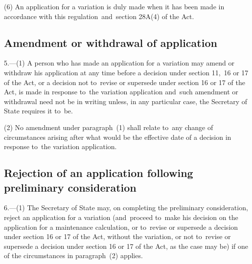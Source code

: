 \documentclass[12pt,a4paper]{article}
\begin{document}
(6) An application for a variation is duly made when it has been made in accordance with this regulation~and~section 28A(4) of the Act.

\subsection[5. Amendment or withdrawal of application]{Amendment or withdrawal of application}

5.---(1)  A person who has made an application for a variation may amend or withdraw his application at any time before a decision under section 11,~16 or 17 of the Act, or a decision not to~revise or supersede under section 16 or 17 of the Act, is made in response to~the variation application and~such amendment or withdrawal need not be in writing unless, in any particular case, the Secretary of State requires it to~be.

(2) No amendment under paragraph~(1) shall relate to~any change of circumstances arising after what would be the effective date of a decision in response to~the variation application.

\subsection[6. Rejection of an application following preliminary consideration]{Rejection of an application following preliminary consideration}

6.---(1)  The Secretary of State may, on completing the preliminary consideration, reject an application for a variation (and~proceed to~make his decision on the application for a maintenance calculation, or to~revise or supersede a decision under section 16 or 17 of the Act, without the variation, or not to~revise or supersede a decision under section 16 or 17 of the Act, as the case may be) if one of the circumstances in paragraph~(2) applies.
\end{document}
